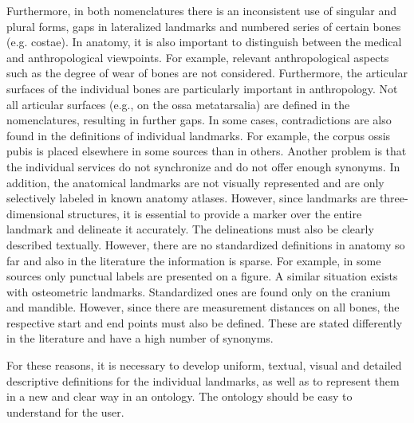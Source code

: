 \documentclass[sw]{iosart2x}
\begin{document}
Furthermore, in both nomenclatures there is an inconsistent use of singular and plural forms, gaps in lateralized landmarks and numbered series of certain bones (e.g. costae).
In anatomy, it is also important to distinguish between the medical and anthropological viewpoints.
For example, relevant anthropological aspects such as the degree of wear of bones are not considered.
Furthermore, the articular surfaces of the individual bones are particularly important in anthropology.
Not all articular surfaces (e.g., on the ossa metatarsalia) are defined in the nomenclatures, resulting in further gaps.
In some cases, contradictions are also found in the definitions of individual landmarks.
For example, the corpus ossis pubis is placed elsewhere in some sources than in others.
Another problem is that the individual services do not synchronize and do not offer enough synonyms. %
In addition, the anatomical landmarks are not visually represented and are only selectively labeled in known anatomy atlases.
However, since landmarks are three-dimensional structures, it is essential to provide a marker over the entire landmark and delineate it accurately.
The delineations must also be clearly described textually.
However, there are no standardized definitions in anatomy so far and also in the literature the information is sparse.
For example, in some sources only punctual labels are presented on a figure.
A similar situation exists with osteometric landmarks.
Standardized ones are found only on the cranium and mandible.
However, since there are measurement distances on all bones, the respective start and end points must also be defined.
These are stated differently in the literature and have a high number of synonyms.

For these reasons, it is necessary to develop uniform, textual, visual and detailed descriptive definitions for the individual landmarks, as well as to represent them in a new and clear way in an ontology.
The ontology should be easy to understand for the user.


\end{document}
